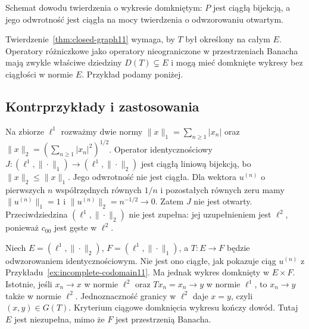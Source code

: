 \begin{center}

\smallskip
\small Schemat dowodu twierdzenia o wykresie domkniętym:
$P$ jest ciągłą bijekcją, a jego odwrotność jest ciągła
na mocy twierdzenia o odwzorowaniu otwartym.
\end{center}

\begin{uwaga}
Twierdzenie~\ref{thm:closed-graph11} wymaga, by $T$ był
określony na całym $E$. Operatory różniczkowe jako
operatory nieograniczone w przestrzeniach Banacha mają
zwykle właściwe dziedziny $D(T)\subsetneq E$ i mogą
mieć domknięte wykresy bez ciągłości w normie $E$.
Przykład podamy poniżej.
\end{uwaga}

\subsection{Kontrprzykłady i zastosowania}

\begin{przyklad}
\label{ex:incomplete-codomain11}
Na zbiorze $\ell^1$ rozważmy dwie normy
$\|x\|_1=\sum_{n\ge1}|x_n|$ oraz
$\|x\|_2=(\sum_{n\ge1}|x_n|^2)^{1/2}$.
Operator identycznościowy
$J:(\ell^1,\|\cdot\|_1)\to(\ell^1,\|\cdot\|_2)$
jest ciągłą liniową bijekcją, bo $\|x\|_2\le\|x\|_1$.
Jego odwrotność nie jest ciągła. Dla wektora $u^{(n)}$
o pierwszych $n$ współrzędnych równych $1/n$
i pozostałych równych zeru mamy
$\|u^{(n)}\|_1=1$ i $\|u^{(n)}\|_2=n^{-1/2}\to0$.
Zatem $J$ nie jest otwarty. Przeciwdziedzina
$(\ell^1,\|\cdot\|_2)$ nie jest zupełna: jej
uzupełnieniem jest $\ell^2$, ponieważ $c_{00}$ jest
gęste w $\ell^2$.
\end{przyklad}

\begin{przyklad}
\label{ex:incomplete-domain-graph11}
Niech $E=(\ell^1,\|\cdot\|_2)$, $F=(\ell^1,\|\cdot\|_1)$,
a $T:E\to F$ będzie odwzorowaniem identycznościowym.
Nie jest ono ciągłe, jak pokazuje ciąg $u^{(n)}$ z
Przykładu~\ref{ex:incomplete-codomain11}. Ma jednak
wykres domknięty w $E\times F$. Istotnie, jeśli
$x_n\to x$ w normie $\ell^2$ oraz
$Tx_n=x_n\to y$ w normie $\ell^1$, to $x_n\to y$
także w normie $\ell^2$. Jednoznaczność granicy
w $\ell^2$ daje $x=y$, czyli $(x,y)\in G(T)$.
Kryterium ciągowe domknięcia wykresu kończy dowód.
Tutaj $E$ jest niezupełna, mimo że $F$ jest przestrzenią Banacha.
\end{przyklad}

